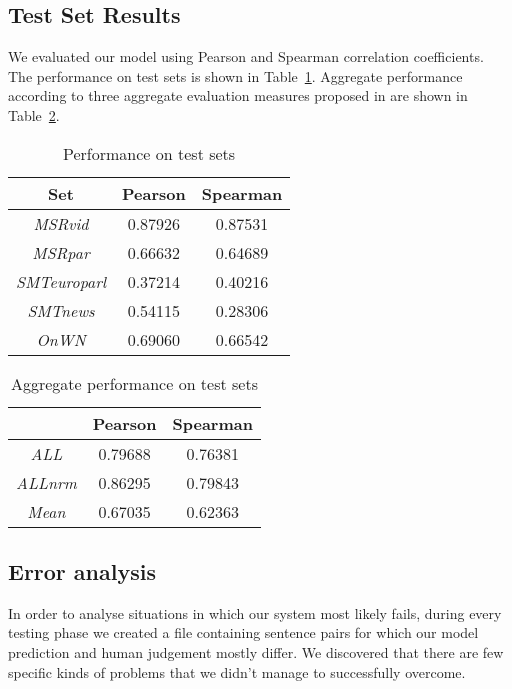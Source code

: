 \documentclass[10pt, a4paper]{article}
\begin{document}
\subsection{Test Set Results}

We evaluated our model using Pearson and Spearman correlation coefficients. The performance on test sets is shown in Table~\ref{tab:test-results-table}. Aggregate performance according to three aggregate evaluation measures proposed in \citep{agirre2012semeval} are shown in Table~\ref{tab:all-results-table}.

\begin{table}[h]
\caption{Performance on test sets}
\label{tab:test-results-table}
\begin{center}
\begin{tabular}{ccc}
\toprule
Set & Pearson & Spearman \\
\midrule
\textit{MSRvid} & 0.87926 & 0.87531 \\
\textit{MSRpar} & 0.66632 & 0.64689 \\
\textit{SMTeuroparl} & 0.37214 & 0.40216 \\
\textit{SMTnews} & 0.54115 & 0.28306 \\
\textit{OnWN} & 0.69060 & 0.66542 \\
\bottomrule
\end{tabular}
\end{center}
\end{table}

\begin{table}[h]
\caption{Aggregate performance on test sets}
\label{tab:all-results-table}
\begin{center}
\begin{tabular}{ccc}
\toprule
& Pearson & Spearman \\
\midrule
\textit{ALL} & 0.79688 & 0.76381\\
\textit{ALLnrm} & 0.86295 & 0.79843 \\
\textit{Mean} & 0.67035 & 0.62363 \\
\bottomrule
\end{tabular}
\end{center}
\end{table}


\subsection{Error analysis}

In order to analyse situations in which our system most likely fails, during every testing phase we created a file containing sentence pairs for which our model prediction and human judgement mostly differ. We discovered that there are few specific kinds of problems that we didn't manage to successfully overcome.
\end{document}
